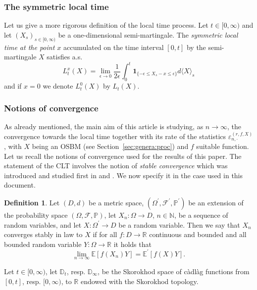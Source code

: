 \documentclass[12pt]{article}
\numberwithin{equation}{section}
\theoremstyle{definition}
\newtheorem{definition}{Definition}
\theoremstyle{remark}
\newcommand{\NN}{\mathbb{N}}
\newcommand{\RR}{\mathbb{R}}
\newcommand{\EE}{\mathbb{E}}
\newcommand{\ind}[1]{\mathbf{1}_{#1}}
\begin{document}
\subsubsection{The symmetric local time}
Let us give a more rigorous definition of the local time process.
Let $t\in [0,\infty)$ and let $(X_s)_{s\in [0,\infty)}$ be a one-dimensional semi-martingale. The {\em symmetric local time at the point $x$\/} accumulated on the time interval $[0,t]$ by the semi-martingale $X$ satisfies a.s.
\begin{equation} \label{def:localtime}
    L_t^x(X)=\lim_{\epsilon\to 0}\frac{1}{2\epsilon}\int_0^t
    \ind{\{-\epsilon\leq X_s-x\leq \epsilon\}}d\langle X\rangle_s
\end{equation}
and if $x=0$ we denote $L_t^0(X)$ by $L_t(X)$.

\subsubsection{Notions of convergence}
As already mentioned, the main aim of this article is studying, as $n\to\infty$, the convergence towards the local time together with its rate of the statistics $\varepsilon_{n,\cdot}^{(r,f,X)}$, with $X$ being an OSBM (see Section~\ref{sec:genera:proc}) and $f$ suitable function. 
Let us recall the notions of convergence used for the results of this paper.
The statement of the CLT involves the notion of {\em stable convergence\/} which was 
introduced and studied first in \cite{renyi} and \cite{AE78}.
We now specify it in the case used in this document.
\begin{definition}
Let $(D,d)$ be a metric space, $(\Omega^\prime ,\mathcal{F}^\prime,\mathbb{P}^\prime)$ be an extension of the probability space $(\Omega ,\mathcal{F},\mathbb{P})$, 
let $X_n \colon \Omega \to D$, $n\in \NN$, be a sequence of random variables, 
and let $X \colon \Omega^\prime \to D$ be a random variable. 
%
Then we say that $X_n$ converges stably in law to $X$
if for all $f\colon D \to \RR$ continuous and bounded and all bounded random variable $Y\colon \Omega \to \RR$ 
it holds that
\begin{equation}\lim_{n\to\infty} \EE\!\left[ f(X_n) Y\right] = \EE^\prime\!\left[ f(X) Y\right].\end{equation}
\end{definition}
%
%
Let $t \in [0,\infty)$, let $\mathbb{D}_t$, resp. $\mathbb{D}_\infty$, be the Skorokhod space of c\`adl\`ag functions from $[0,t]$, resp. $[0,\infty)$, to $\RR$ endowed with the Skorokhod topology.
\end{document}

